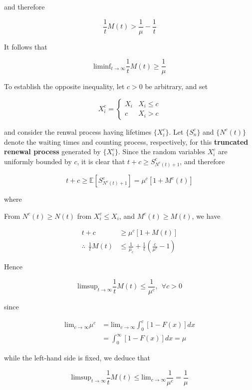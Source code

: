 \documentclass[12pt]{article}
\theoremstyle{nonumberbreak}
\begin{document}
and therefore

$$
\frac{1}{t} M(t) > \frac{1}{\mu} - \frac{1}{t}
$$

It follows that

$$
\mathrm{lim inf}_{t \to \infty} \frac{1}{t} M(t) \ge \frac{1}{\mu}
$$

To establish the opposite inequality, let $c > 0$ be arbitrary, and set

$$
X_i^c = \begin{cases}
X_i & X_i \le c \\
c   & X_i > c
\end{cases}
$$

and consider the renwal process having lifetimes $\{ X_i^c \}$. Let $\{ S_n^c \}$ and $\{ N^c(t) \}$ denote the waiting times and counting process, respectively, for this \textbf{truncated renewal process} generated by $\{ X_i^c \}$. Since the random variables $X_i^c$ are uniformly bounded by $c$, it is clear that $t + c \ge S^c_{N^c(t) + 1}$, and therefore

$$
t + c \ge \mathbb{E} \left[ S^c_{N^c(t) + 1} \right] = \mu^c \left[ 1 + M^c (t) \right]
$$


where 


From $N^c(t) \ge N(t)$ from $X_i^c \le X_i$, and $M^c (t) \ge M(t)$, we have

$$
\begin{aligned}
t + c &\ge \mu^c \left[ 1 + M(t) \right] \\[8pt]
\therefore \ \ \frac{1}{t} M(t) &\le \frac{1}{\mu_c} + \frac{1}{t} \left( \frac{c}{\mu^c} -1 \right)
\end{aligned}
$$


Hence 

$$
\mathrm{lim sup}_{t \to \infty} \frac{1}{t} M(t) \le \frac{1}{\mu^c}, \ \ \forall c > 0
$$

since 

$$
\begin{aligned}
\mathrm{lim}_{c\to \infty} \mu^c &=\mathrm{lim}_{c \to \infty} \int_0^c \left[ 1- F(x) \right] dx  \\[8pt]
&= \int_0^\infty [1-F(x)] dx = \mu
\end{aligned}
$$

while the left-hand side is fixed, we deduce that

$$
\mathrm{lim sup}_{t \to \infty} \frac{1}{t} M(t) \le \mathrm{lim}_{c \to \infty} \frac{1}{\mu^c} = \frac{1}{\mu}
$$
\end{document}
